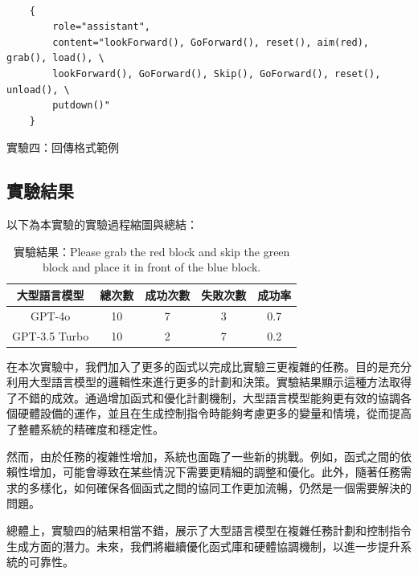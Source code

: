 \documentclass[class=NCU_thesis, crop=false]{standalone}
\begin{document}
\begin{listing}[h]
    \begin{verbatim}

    {
        role="assistant",
        content="lookForward(), GoForward(), reset(), aim(red), grab(), load(), \
        lookForward(), GoForward(), Skip(), GoForward(), reset(), unload(), \
        putdown()"
    }

    \end{verbatim}
\caption{實驗四：回傳格式範例} 
\end{listing}
\clearpage
\subsection{實驗結果}
以下為本實驗的實驗過程縮圖與總結：\\


\begin{table}[h]
    \centering
    \caption{實驗結果：Please grab the red block and skip the green block and place it in front of the blue block.}
    \begin{tabular}{ccccc}
    \hline
    大型語言模型 & 總次數 & 成功次數 & 失敗次數 & 成功率 \\
    \hline
    GPT-4o & 10 & 7 & 3 & 0.7\\
    \hline
    GPT-3.5 Turbo & 10 & 2 & 7 & 0.2\\
    \hline
    \end{tabular}
\end{table}
在本次實驗中，我們加入了更多的函式以完成比實驗三更複雜的任務。目的是充分利用大型語言模型的邏輯性來進行更多的計劃和決策。實驗結果顯示這種方法取得了不錯的成效。通過增加函式和優化計劃機制，大型語言模型能夠更有效的協調各個硬體設備的運作，並且在生成控制指令時能夠考慮更多的變量和情境，從而提高了整體系統的精確度和穩定性。

然而，由於任務的複雜性增加，系統也面臨了一些新的挑戰。例如，函式之間的依賴性增加，可能會導致在某些情況下需要更精細的調整和優化。此外，隨著任務需求的多樣化，如何確保各個函式之間的協同工作更加流暢，仍然是一個需要解決的問題。

總體上，實驗四的結果相當不錯，展示了大型語言模型在複雜任務計劃和控制指令生成方面的潛力。未來，我們將繼續優化函式庫和硬體協調機制，以進一步提升系統的可靠性。
\end{document}
